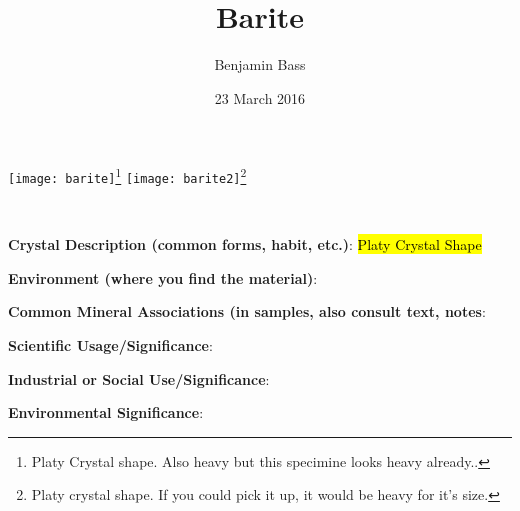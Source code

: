 \documentclass[10pt]{article}
\author{Benjamin Bass}
\date{23 March 2016}
\title{\vspace{-2.0cm}Barite} %
\begin{document}
\maketitle


\begin{center}
  \texttt{[image: barite]}\footnote{Platy Crystal shape. Also heavy but this specimine looks heavy already..}
  \texttt{[image: barite2]}\footnote{Platy crystal shape. If you could pick it up, it would be heavy for it's size.}
\end{center}



\
\
\
\
\
\
\
\
\
\
\

\begin{framed}
  \textbf{Crystal Description (common forms, habit, etc.)}: \hl{Platy Crystal Shape}
\end{framed}

\begin{framed}
  \textbf{Environment (where you find the material)}: 
\end{framed}

\begin{framed}
  \textbf{Common Mineral Associations (in samples, also consult text, notes}: 
\end{framed}

\begin{framed}
  \textbf{Scientific Usage/Significance}: 
\end{framed}

\begin{framed}
  \textbf{Industrial or Social Use/Significance}: 
\end{framed}

\begin{framed}
  \textbf{Environmental Significance}: 
\end{framed}

\end{document}

